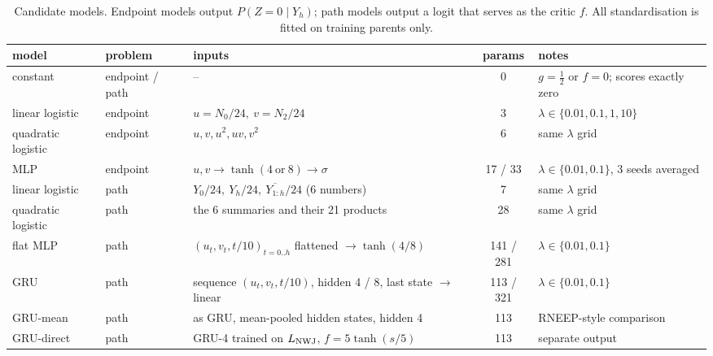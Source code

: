 \begin{table}[htbp]
\centering
\footnotesize
\caption{Candidate models. Endpoint models output $P(Z=0\mid Y_h)$; path models output a logit that serves as the critic $f$. All standardisation is fitted on training parents only.}\label{tab:models}
\begin{tabular}{l l p{5.2cm} c p{3.6cm}}
\toprule
model & problem & inputs & params & notes \\
\midrule
constant & endpoint / path & -- & 0 & $g=\tfrac12$ or $f=0$; scores exactly zero \\
linear logistic & endpoint & $u=N_0/24,\ v=N_2/24$ & 3 & $\lambda\in\{0.01,0.1,1,10\}$ \\
quadratic logistic & endpoint & $u,v,u^2,uv,v^2$ & 6 & same $\lambda$ grid \\
MLP & endpoint & $u,v \to \tanh(4\ \text{or}\ 8) \to \sigma$ & 17 / 33 & $\lambda\in\{0.01,0.1\}$, 3 seeds averaged \\
linear logistic & path & $Y_0/24,\ Y_h/24,\ \overline{Y_{1:h}}/24$ (6 numbers) & 7 & same $\lambda$ grid \\
quadratic logistic & path & the 6 summaries and their 21 products & 28 & same $\lambda$ grid \\
flat MLP & path & $(u_t,v_t,t/10)_{t=0..h}$ flattened $\to \tanh(4/8)$ & 141 / 281 & $\lambda\in\{0.01,0.1\}$ \\
GRU & path & sequence $(u_t,v_t,t/10)$, hidden 4 / 8, last state $\to$ linear & 113 / 321 & $\lambda\in\{0.01,0.1\}$ \\
GRU-mean & path & as GRU, mean-pooled hidden states, hidden 4 & 113 & RNEEP-style comparison \\
GRU-direct & path & GRU-4 trained on $L_{\rm NWJ}$, $f = 5\tanh(s/5)$ & 113 & separate output \\
\bottomrule
\end{tabular}
\end{table}